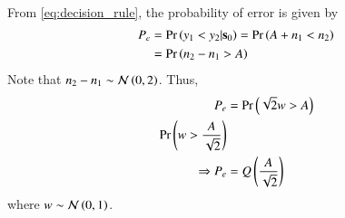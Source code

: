 \begin{enumerate}[label=\thesection.\arabic*.,ref=\thesection.\theenumi]
\begin{align}
\end{align}
From \ref{eq:decision_rule}, the probability of error is given by 
\begin{align}
P_e &= \Pr\left(y_1 < y_2 |\mathbf{s}_0\right) = \Pr\left(A+n_1 < n_2\right)\\
&= \Pr\left(n_2 - n_1 > A\right)
\end{align}
Note that $n_2 - n_1 \sim \mathcal{N}\left(0,2\right)$. Thus,
\begin{align}
P_e &= \Pr\left(\sqrt{2}w > A\right)\\
\Pr\left(w > \dfrac{A}{\sqrt{2}}\right)\\
\Rightarrow P_e &= Q\left(\frac{A}{\sqrt{2}}\right)
\end{align}
where $w \sim \mathcal{N}\left(0,1\right)$.
\end{enumerate}
